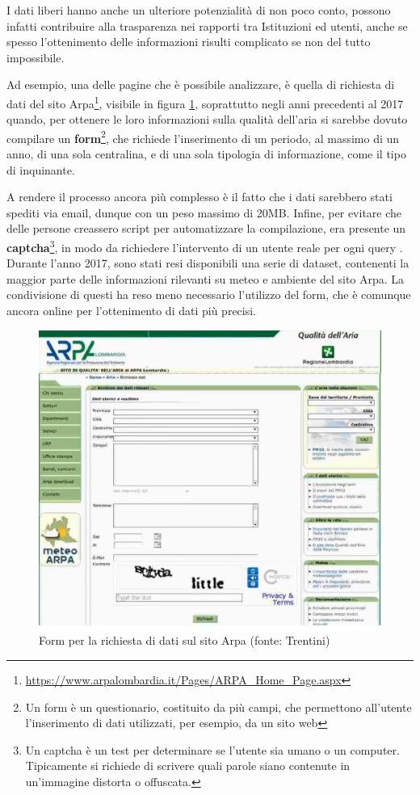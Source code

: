 \documentclass[a4paper,12pt]{report}
\newcommand{\engstyle}[1]{\textbf{#1}}
\newcommand{\skipline}{\vspace{0.2in}}
\begin{document}
\skipline
I dati liberi hanno anche un ulteriore potenzialità di non poco conto, 
possono infatti contribuire alla trasparenza nei rapporti tra Istituzioni ed utenti, 
anche se spesso l'ottenimento delle informazioni risulti complicato 
se non del tutto impossibile.

Ad esempio, una delle pagine che è possibile analizzare, è quella di richiesta 
di dati del sito 
Arpa\footnote{\url{https://www.arpalombardia.it/Pages/ARPA_Home_Page.aspx}}, 
visibile in figura \ref{fig:arpa},
soprattutto negli anni precedenti al 2017 quando, per ottenere le loro informazioni 
sulla qualità dell'aria si sarebbe dovuto compilare un 
\engstyle{form}\footnote{Un form è un questionario, costituito da più campi, che 
permettono all'utente l'inserimento di dati utilizzati, per esempio, da un sito web}, 
che richiede l'inserimento di un periodo, al massimo di un anno, di una sola 
centralina, e di una sola tipologia di informazione, come il tipo di inquinante. 

A rendere il processo ancora più complesso è il fatto che i dati sarebbero stati 
spediti via email, dunque con un peso massimo di 20MB. 
Infine, per evitare che delle persone creassero script per automatizzare la compilazione, 
era presente un \engstyle{captcha}\footnote{Un captcha è un test per determinare se l'utente 
sia umano o un computer. Tipicamente si richiede di scrivere quali parole siano 
contenute in un'immagine distorta o offuscata.}, in modo da richiedere l'intervento 
di un utente reale per ogni query \cite{TRENTINI:1}. 
Durante l'anno 2017, sono stati resi disponibili una serie di dataset, contenenti la maggior 
parte delle informazioni rilevanti su meteo e ambiente del sito Arpa. 
La condivisione di questi ha reso meno necessario l'utilizzo del form, che 
è comunque ancora online per l'ottenimento di dati più precisi. 

\begin{figure}
    \hfill\includegraphics[width=0.7\linewidth]{img/arpa.png}\hspace*{\fill}
    \caption{Form per la richiesta di dati sul sito Arpa (fonte: Trentini)}
    \label{fig:arpa}
\end{figure}
\end{document}
